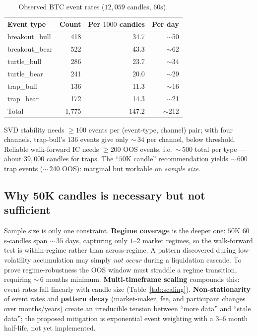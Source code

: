 \documentclass[11pt]{article}
\newcommand{\toprule}{\hline}
\newcommand{\midrule}{\hline}
\newcommand{\bottomrule}{\hline}
\newcommand{\ic}{\textnormal{IC}}
\begin{document}
\begin{table}[h]
\centering\footnotesize
\caption{Observed BTC event rates ($12{,}059$ candles, $60$s).}
\label{tab:events}
\begin{tabular}{lrrr}
\toprule
Event type & Count & Per $1000$ candles & Per day \\
\midrule
breakout\_bull & 418 & 34.7 & $\sim$50 \\
breakout\_bear & 522 & 43.3 & $\sim$62 \\
turtle\_bull   & 286 & 23.7 & $\sim$34 \\
turtle\_bear   & 241 & 20.0 & $\sim$29 \\
trap\_bull     & 136 & 11.3 & $\sim$16 \\
trap\_bear     & 172 & 14.3 & $\sim$21 \\
\midrule
Total          & 1{,}775 & 147.2 & $\sim$212 \\
\bottomrule
\end{tabular}
\end{table}

SVD stability needs $\geq 100$ events per (event-type, channel) pair; with four channels,
trap-bull's $136$ events give only $\sim$\,$34$ per channel, below threshold. Reliable
walk-forward \ic{} needs $\geq 200$ OOS events, i.e.\ $\sim$\,$500$ total per type --- about
$39{,}000$ candles for traps. The ``$50$K candle'' recommendation yields $\sim$\,$600$ trap
events ($\sim$\,$240$ OOS): marginal but workable on \emph{sample size}.

\subsection{Why 50K candles is necessary but not sufficient}
Sample size is only one constraint. \textbf{Regime coverage} is the deeper one: $50$K
$60$s-candles span $\sim$\,$35$ days, capturing only $1$--$2$ market regimes, so the
walk-forward test is within-regime rather than across-regime. A pattern discovered during
low-volatility accumulation may simply \emph{not occur} during a liquidation cascade. To
prove regime-robustness the OOS window must straddle a regime transition, requiring
$\sim$\,$6$ months minimum. \textbf{Multi-timeframe scaling} compounds this: event rates
fall linearly with candle size (Table~\ref{tab:scaling}). \textbf{Non-stationarity} of
event rates and \textbf{pattern decay} (market-maker, fee, and participant changes over
months/years) create an irreducible tension between ``more data'' and ``stale data''; the
proposed mitigation is exponential event weighting with a $3$--$6$ month half-life, not yet
implemented.
\end{document}
